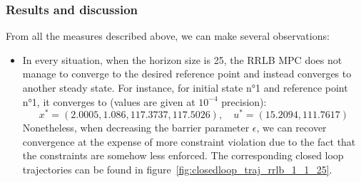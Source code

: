 \documentclass[12pt]{article}
\begin{document}
\subsubsection{Results and discussion}\label{sec:results-discussion}

\noindent From all the measures described above, we can make several observations:

\begin{itemize}[label=\textbullet]
	\item In every situation, when the horizon size is 25, the RRLB MPC does not manage to converge to the desired reference point and instead converges to another steady state.
	For instance, for initial state n°1 and reference point n°1, it converges to (values are given at $10^{-4}$ precision):
	$$x^*=(2.0005, 1.086, 117.3737, 117.5026),\quad u^*=(15.2094, 111.7617)$$
	Nonetheless, when decreasing the barrier parameter $\epsilon$, we can recover convergence at the expense of more constraint violation due to the fact that the constraints are somehow less enforced.
	The corresponding closed loop trajectories can be found in figure~\ref{fig:closedloop_traj_rrlb_1_1_25}.


\end{itemize}
\end{document}
